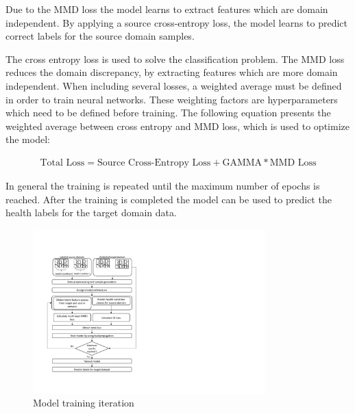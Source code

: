 Due to the MMD loss the model learns to extract features which are domain independent. By applying a source cross-entropy loss, the model learns to predict correct labels for the source domain samples.

The cross entropy loss is used to solve the classification problem. The MMD loss reduces the domain discrepancy, by extracting features which are more domain independent. When including several losses, a weighted average must be defined in order to train neural networks. These weighting factors are hyperparameters which need to be defined before training. The following equation presents the weighted average between cross entropy and MMD loss, which is used to optimize the model:

\begin{align}
    \mbox{Total Loss} = \mbox{Source Cross-Entropy Loss} + \mbox{GAMMA} * \mbox{MMD Loss}
\end{align}

In general the training is repeated until the maximum number of epochs is reached. After the training is completed the model can be used to predict the health labels for the target domain data. 

\begin{figure}[htpb]
  \centering
  \includegraphics[width=0.8\textwidth]{training_process_mmd.pdf}
  \caption {Model training iteration} \label{fig:Training_Process_MMD}
\end{figure}
\FloatBarrier 


